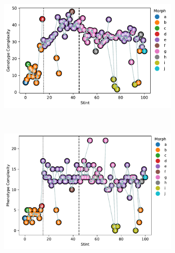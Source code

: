 \begin{figure}

\centering

\begin{subfigure}{0.48\linewidth}
\includegraphics[width=\linewidth, clip, trim={0 0 1.8cm 0}]{binder-2025-08-26-dotfig/binder/teeplots/2025-08-26-dotfig/bucket=prq49+cat=morph+endeavor=16+transform=filter-Series-16005+viz=letterscatter-vline+x=stint+y=critical-fitness-complexity+ext=.pdf}
\end{subfigure}
~~
\begin{subfigure}{0.48\linewidth}
\includegraphics[width=\linewidth, clip, trim={0 0 1.8cm 0}]{binder-2025-08-26-dotfig/binder/teeplots/2025-08-26-dotfig/bucket=prq49+cat=morph+endeavor=16+transform=filter-Series-16005+viz=letterscatter-vline+x=stint+y=cardinal-interface-complexity+ext=.pdf}
\end{subfigure}%


\end{figure}
